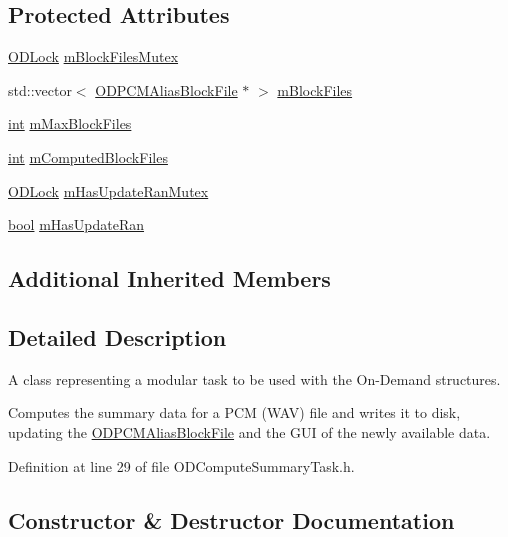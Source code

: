 \subsection*{Protected Attributes}
\begin{DoxyCompactItemize}
\item 
\hyperlink{class_o_d_lock}{O\+D\+Lock} \hyperlink{class_o_d_compute_summary_task_a559f0f89aadfdaa0b5e16177d3f888bd}{m\+Block\+Files\+Mutex}
\item 
std\+::vector$<$ \hyperlink{class_o_d_p_c_m_alias_block_file}{O\+D\+P\+C\+M\+Alias\+Block\+File} $\ast$ $>$ \hyperlink{class_o_d_compute_summary_task_ad68b1da3dcbe481ab2e438c3fdda0920}{m\+Block\+Files}
\item 
\hyperlink{xmltok_8h_a5a0d4a5641ce434f1d23533f2b2e6653}{int} \hyperlink{class_o_d_compute_summary_task_a0a0d29cc904dc42a7060c396ac3bf391}{m\+Max\+Block\+Files}
\item 
\hyperlink{xmltok_8h_a5a0d4a5641ce434f1d23533f2b2e6653}{int} \hyperlink{class_o_d_compute_summary_task_a46a4ba6dbbcf45d41488ce3a7c992444}{m\+Computed\+Block\+Files}
\item 
\hyperlink{class_o_d_lock}{O\+D\+Lock} \hyperlink{class_o_d_compute_summary_task_a7df3770e2254fc12c16be67401ceaab4}{m\+Has\+Update\+Ran\+Mutex}
\item 
\hyperlink{mac_2config_2i386_2lib-src_2libsoxr_2soxr-config_8h_abb452686968e48b67397da5f97445f5b}{bool} \hyperlink{class_o_d_compute_summary_task_a6c1b4d0272f909d4b1c7e04e9ab73fe3}{m\+Has\+Update\+Ran}
\end{DoxyCompactItemize}
\subsection*{Additional Inherited Members}


\subsection{Detailed Description}
A class representing a modular task to be used with the On-\/\+Demand structures. 

Computes the summary data for a P\+CM (W\+AV) file and writes it to disk, updating the \hyperlink{class_o_d_p_c_m_alias_block_file}{O\+D\+P\+C\+M\+Alias\+Block\+File} and the G\+UI of the newly available data. 

Definition at line 29 of file O\+D\+Compute\+Summary\+Task.\+h.



\subsection{Constructor \& Destructor Documentation}
